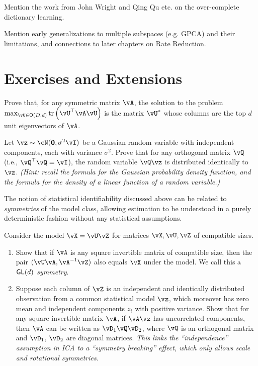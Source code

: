 \documentclass[../../book-main.tex]{subfiles}
\begin{document}
Mention the work from John Wright and Qing Qu etc. on the over-complete dictionary learning.

Mention early generalizations to multiple subspaces (e.g. GPCA) and their limitations, and connections to later chapters on Rate Reduction.


\section{Exercises and Extensions}


\begin{exercise}\label{exercise:principal-components-derivation}
    Prove that, for any symmetric matrix \(\vA\), the solution to the problem \(\max_{\vU \in \O(D, d)}\tr\left(\vU^{\top}\vA\vU\right)\) is the matrix \(\vU^{\ast}\) whose columns are the top \(d\) unit eigenvectors of \(\vA\).
\end{exercise}

\begin{exercise}\label{exercise:gaussian-rot-invar}
    Let $\vz \sim \cN(\Zero, \sigma^2 \vI)$ be a Gaussian random variable with independent components, each with variance $\sigma^2$. 
    Prove that for any orthogonal matrix $\vQ$ (i.e., $\vQ^\top \vQ = \vI$), the random variable $\vQ \vz$ is distributed identically to $\vz$. 
    \textit{(Hint: recall the formula for the Gaussian probability density function, and the formula for the density of a linear function of a random variable.) }
\end{exercise}

\begin{exercise}\label{exercise:symmetry-identifiability}
    The notion of statistical identifiability discussed above can be related to \textit{symmetries} of the model class, allowing estimation to be understood in a purely deterministic fashion without any statistical assumptions.

    Consider the model $\vX = \vU \vZ$ for matrices $\vX, \vU, \vZ$ of compatible sizes.
    \begin{enumerate}
        \item Show that if $\vA$ is any square invertible matrix of compatible size, then the pair
        $(\vU \vA, \vA^{-1} \vZ)$ also equals $\vX$ under the model. We call this a \textit{$\mathsf{GL}(d)$ symmetry}.
        \item Suppose each column of $\vZ$ is an independent and identically distributed observation from a common statistical model $\vz$, which moreover has zero mean and independent components $z_i$ with positive variance.
        Show that for any square invertible matrix $\vA$, if $\vA \vz$ has uncorrelated components, then $\vA$ can be written as $\vD_1 \vQ \vD_2$, where $\vQ$ is an orthogonal matrix and $\vD_1$, $\vD_2$ are diagonal matrices.
        \textit{This links the ``independence'' assumption in ICA to a ``symmetry breaking'' effect, which only allows scale and rotational symmetries.}
    \end{enumerate}

\end{exercise}
\end{document}
